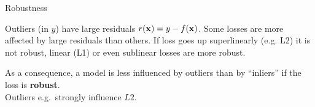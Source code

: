 \documentclass[11pt,compress,t,notes=noshow, xcolor=table]{beamer}
\begin{document}
\begin{frame2}[small]{Robustness}

Outliers (in $y$) have large residuals $r(\mathbf{x}) = y - f(\mathbf{x})$. Some losses are more
affected by large residuals than others. If loss goes up superlinearly (e.g. L2) it is not robust, linear (L1) or even sublinear losses are more robust.

\vfill

%
{
  As a consequence, a model is less influenced by outliers than by ``inliers'' if 
  the loss is \textbf{robust}.\\
  Outliers e.g.\ strongly influence $L2$.
}%

\vfill


% 
% 
% 
% 

\end{frame2}

\end{document}
